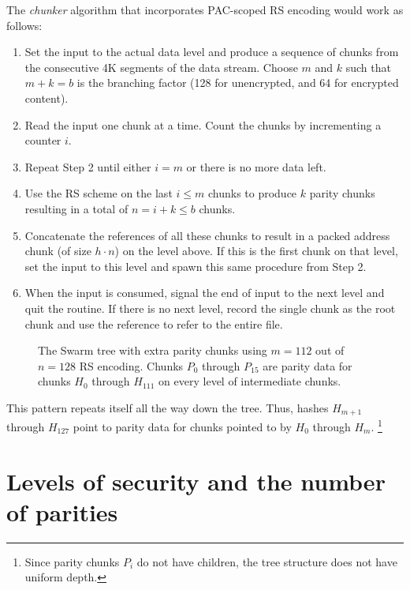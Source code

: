 \documentclass[a4paper,11pt]{article}
\begin{document}
The \emph{chunker} algorithm that incorporates PAC-scoped RS encoding would work as follows:
\begin{enumerate}[noitemsep]
\item Set the input to the actual data level and produce a sequence of chunks from the consecutive 4K segments of the data stream. Choose $m$ and $k$ such that $m+k=b$ is the branching factor (128 for unencrypted, and 64 for encrypted content).
\item Read the input one chunk at a time. Count the chunks by incrementing a counter $i$.
\item Repeat Step 2 until either $i = m$ or there is no more data left.
\item Use the RS scheme on the last $i\leq m$ chunks to produce $k$ parity chunks resulting in a total of $n = i+k \leq b$ chunks.
\item Concatenate the references of all these chunks to result in a packed address chunk (of size $h\cdot n$) on the level above. If this is the first chunk on that level, set the input to this level and spawn this same procedure from Step 2.
\item When the input is consumed, signal the end of input to the next level and quit the routine. If there is no next level, record the single chunk as the root chunk and use the reference to refer to the entire file.
\end{enumerate}



\begin{figure}[hp]
   \centering
   \resizebox{1\textwidth}{!}{
        
   }
   \caption[Swarm hash erasure]{The Swarm tree with extra parity chunks using $m=112$ out of $n=128$ RS encoding. Chunks $P_{0}$ through $P_{15}$ are parity data for chunks $H_0 $ through $H_{111}$ on every level of intermediate chunks.}
   \label{fig:Swarm-hash-erasure}
\end{figure}


This pattern repeats itself all the way down the tree. Thus, hashes $H_{m+1}$ through $H_{127}$ point to parity data for chunks pointed to by $H_0$ through $H_{m}$.%
%
\footnote{Since parity chunks $P_i$ do not have children, the tree structure does not have uniform depth.}

\section{Levels of security and the number of parities}\label{sec:levels}
\end{document}

